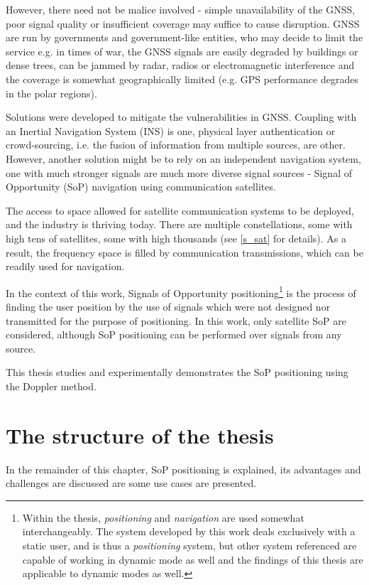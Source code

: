 However, there need not be malice involved - simple unavailability of the GNSS, poor signal quality or insufficient coverage may suffice to cause disruption. GNSS are run by governments and government-like entities, who may decide to limit the service e.g. in times of war, the GNSS signals are easily degraded by buildings or dense trees, can be jammed by radar, radios or electromagnetic interference and the coverage is somewhat geographically limited (e.g. GPS performance degrades in the polar regions\cite{int01, int02}).

Solutions were developed to mitigate the vulnerabilities in GNSS. Coupling with an Inertial Navigation System (INS) is one, physical layer authentication\cite{sat08} or crowd-sourcing, i.e. the fusion of information from multiple sources, are other\cite{int01}. However, another solution might be to rely on an independent navigation system, one with much stronger signals are much more diverse signal sources - Signal of Opportunity (SoP) navigation using communication satellites.

The access to space allowed for satellite communication systems to be deployed, and the industry is thriving today. There are multiple constellations, some with high tens of satellites, some with high thousands (see \autoref{s_sat} for details). As a result, the frequency space is filled by communication transmissions, which can be readily used for navigation.

In the context of this work, Signals of Opportunity positioning\footnote{Within the thesis, \textit{positioning} and \textit{navigation} are used somewhat interchangeably. The system developed by this work deals exclusively with a static user, and is thus a \textit{positioning} system, but other system referenced are capable of working in dynamic mode as well and the findings of this thesis are applicable to dynamic modes as well.} is the process of finding the user position by the use of signals which were not designed nor transmitted for the purpose of positioning. In this work, only satellite SoP are considered, although SoP positioning can be performed over signals from any source. 

This thesis studies and experimentally demonstrates the SoP positioning using the Doppler method.



\section{The structure of the thesis}
In the remainder of this chapter, SoP positioning is explained, its advantages and challenges are discussed are some use cases are presented.

